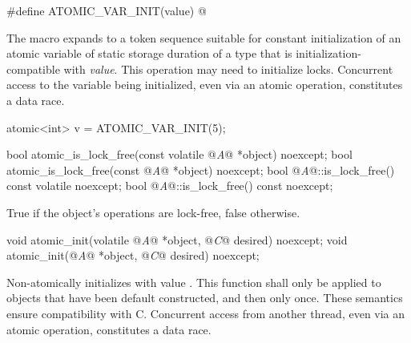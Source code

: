 \begin{itemdecl}
#define ATOMIC_VAR_INIT(value) @\seebelow@
\end{itemdecl}

\begin{itemdescr}
\pnum
The macro expands to a token sequence suitable for
constant initialization of
an atomic variable of static storage duration of a type that is
initialization-compatible with \textit{value}.
\enternote This operation may need to initialize locks. \exitnote
Concurrent access to the variable being initialized, even via an atomic operation,
constitutes a data race. \enterexample
\begin{codeblock}
atomic<int> v = ATOMIC_VAR_INIT(5);
\end{codeblock}
\exitexample
\end{itemdescr}

%
%
\begin{itemdecl}
bool atomic_is_lock_free(const volatile @\textit{A}@ *object) noexcept;
bool atomic_is_lock_free(const @\textit{A}@ *object) noexcept;
bool @\textit{A}@::is_lock_free() const volatile noexcept;
bool @\textit{A}@::is_lock_free() const noexcept;
\end{itemdecl}

\begin{itemdescr}
\pnum
\returns True if the object's operations are lock-free, false otherwise.
\end{itemdescr}

\begin{itemdecl}
void atomic_init(volatile @\textit{A}@ *object, @\textit{C}@ desired) noexcept;
void atomic_init(@\textit{A}@ *object, @\textit{C}@ desired) noexcept;
\end{itemdecl}

\begin{itemdescr}
\pnum
\effects Non-atomically
initializes  with value . This function shall only be applied
to objects that have been default constructed, and then only once.
\enternote
These semantics ensure compatibility with C.
\exitnote
\enternote 
Concurrent access from another thread, even via an atomic operation, constitutes
a data race.
\exitnote

\end{itemdescr}

